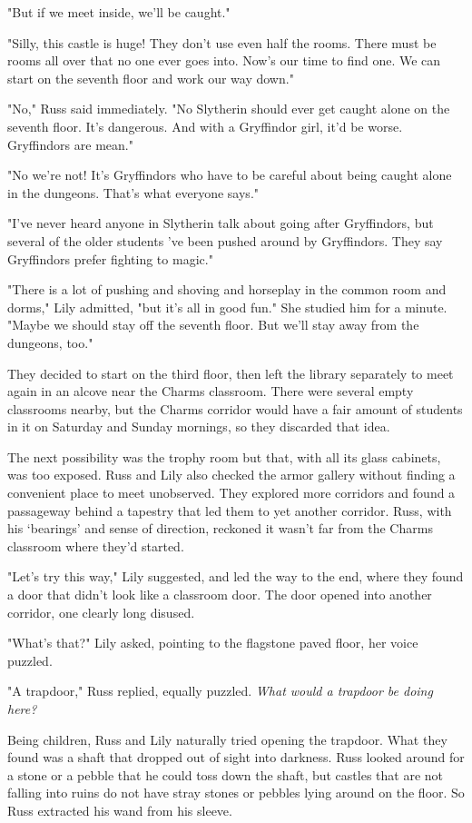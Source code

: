 "But if we meet inside, we'll be caught."

"Silly, this castle is huge! They don't use even half the rooms. There must be rooms all over that no one ever goes into. Now's our time to find one. We can start on the seventh floor and work our way down."

"No," Russ said immediately. "No Slytherin should ever get caught alone on the seventh floor. It's dangerous. And with a Gryffindor girl, it'd be worse. Gryffindors are mean."

"No we're not! It's Gryffindors who have to be careful about being caught alone in the dungeons. That's what everyone says."

"I've never heard anyone in Slytherin talk about going after Gryffindors, but several of the older students 've been pushed around by Gryffindors. They say Gryffindors prefer fighting to magic."

"There is a lot of pushing and shoving and horseplay in the common room and dorms," Lily admitted, "but it's all in good fun." She studied him for a minute. "Maybe we should stay off the seventh floor. But we'll stay away from the dungeons, too."

They decided to start on the third floor, then left the library separately to meet again in an alcove near the Charms classroom. There were several empty classrooms nearby, but the Charms corridor would have a fair amount of students in it on Saturday and Sunday mornings, so they discarded that idea.

The next possibility was the trophy room but that, with all its glass cabinets, was too exposed. Russ and Lily also checked the armor gallery without finding a convenient place to meet unobserved. They explored more corridors and found a passageway behind a tapestry that led them to yet another corridor. Russ, with his `bearings' and sense of direction, reckoned it wasn't far from the Charms classroom where they'd started.

"Let's try this way," Lily suggested, and led the way to the end, where they found a door that didn't look like a classroom door. The door opened into another corridor, one clearly long disused.

"What's that?" Lily asked, pointing to the flagstone paved floor, her voice puzzled.

"A trapdoor," Russ replied, equally puzzled. \emph{What would a trapdoor be doing here?}

Being children, Russ and Lily naturally tried opening the trapdoor. What they found was a shaft that dropped out of sight into darkness. Russ looked around for a stone or a pebble that he could toss down the shaft, but castles that are not falling into ruins do not have stray stones or pebbles lying around on the floor. So Russ extracted his wand from his sleeve.

